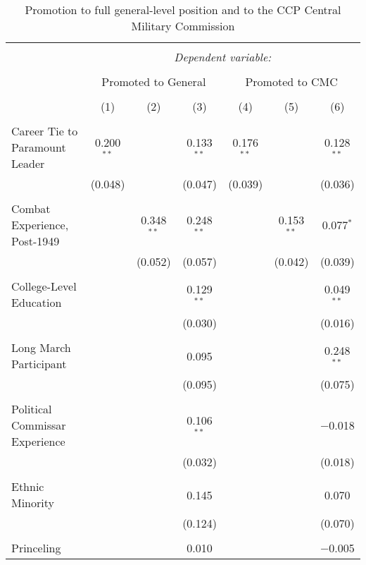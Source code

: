 
\begin{table}[!htbp] \centering 
  \caption{Promotion to full general-level position and to the CCP Central Military Commission} 
  \label{main_results} 
\begin{tabular}{@{\extracolsep{5pt}}lcccccc} 
\\[-1.8ex]\hline 
\hline \\[-1.8ex] 
 & \multicolumn{6}{c}{\textit{Dependent variable:}} \\ 
\cline{2-7} 
\\[-1.8ex] & \multicolumn{3}{c}{Promoted to General} & \multicolumn{3}{c}{Promoted to CMC} \\ 
\\[-1.8ex] & (1) & (2) & (3) & (4) & (5) & (6)\\ 
\hline \\[-1.8ex] 
 Career Tie to Paramount Leader & 0.200$^{**}$ &  & 0.133$^{**}$ & 0.176$^{**}$ &  & 0.128$^{**}$ \\ 
  & (0.048) &  & (0.047) & (0.039) &  & (0.036) \\ 
  & & & & & & \\ 
 Combat Experience, Post-1949 &  & 0.348$^{**}$ & 0.248$^{**}$ &  & 0.153$^{**}$ & 0.077$^{*}$ \\ 
  &  & (0.052) & (0.057) &  & (0.042) & (0.039) \\ 
  & & & & & & \\ 
 College-Level Education &  &  & 0.129$^{**}$ &  &  & 0.049$^{**}$ \\ 
  &  &  & (0.030) &  &  & (0.016) \\ 
  & & & & & & \\ 
 Long March Participant &  &  & 0.095 &  &  & 0.248$^{**}$ \\ 
  &  &  & (0.095) &  &  & (0.075) \\ 
  & & & & & & \\ 
 Political Commissar Experience &  &  & 0.106$^{**}$ &  &  & $-$0.018 \\ 
  &  &  & (0.032) &  &  & (0.018) \\ 
  & & & & & & \\ 
 Ethnic Minority &  &  & 0.145 &  &  & 0.070 \\ 
  &  &  & (0.124) &  &  & (0.070) \\ 
  & & & & & & \\ 
 Princeling &  &  & 0.010 &  &  & $-$0.005 \\ 

\end{tabular}
\end{table}
